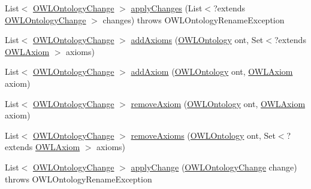 \begin{DoxyCompactItemize}
\item 
List$<$ \hyperlink{classorg_1_1semanticweb_1_1owlapi_1_1model_1_1_o_w_l_ontology_change}{O\-W\-L\-Ontology\-Change} $>$ \hyperlink{interfaceorg_1_1semanticweb_1_1owlapi_1_1model_1_1_o_w_l_ontology_manager_a57a1f7ecc3353740ff3c6b51084916b6}{apply\-Changes} (List$<$?extends \hyperlink{classorg_1_1semanticweb_1_1owlapi_1_1model_1_1_o_w_l_ontology_change}{O\-W\-L\-Ontology\-Change} $>$ changes)  throws O\-W\-L\-Ontology\-Rename\-Exception
\item 
List$<$ \hyperlink{classorg_1_1semanticweb_1_1owlapi_1_1model_1_1_o_w_l_ontology_change}{O\-W\-L\-Ontology\-Change} $>$ \hyperlink{interfaceorg_1_1semanticweb_1_1owlapi_1_1model_1_1_o_w_l_ontology_manager_a40d5dd3a748269c6281a6a97a570e89c}{add\-Axioms} (\hyperlink{interfaceorg_1_1semanticweb_1_1owlapi_1_1model_1_1_o_w_l_ontology}{O\-W\-L\-Ontology} ont, Set$<$?extends \hyperlink{interfaceorg_1_1semanticweb_1_1owlapi_1_1model_1_1_o_w_l_axiom}{O\-W\-L\-Axiom} $>$ axioms)
\item 
List$<$ \hyperlink{classorg_1_1semanticweb_1_1owlapi_1_1model_1_1_o_w_l_ontology_change}{O\-W\-L\-Ontology\-Change} $>$ \hyperlink{interfaceorg_1_1semanticweb_1_1owlapi_1_1model_1_1_o_w_l_ontology_manager_a531826deaaaee451ce7bd00003e65536}{add\-Axiom} (\hyperlink{interfaceorg_1_1semanticweb_1_1owlapi_1_1model_1_1_o_w_l_ontology}{O\-W\-L\-Ontology} ont, \hyperlink{interfaceorg_1_1semanticweb_1_1owlapi_1_1model_1_1_o_w_l_axiom}{O\-W\-L\-Axiom} axiom)
\item 
List$<$ \hyperlink{classorg_1_1semanticweb_1_1owlapi_1_1model_1_1_o_w_l_ontology_change}{O\-W\-L\-Ontology\-Change} $>$ \hyperlink{interfaceorg_1_1semanticweb_1_1owlapi_1_1model_1_1_o_w_l_ontology_manager_a15dee6602a229149bdd22a97509ec64a}{remove\-Axiom} (\hyperlink{interfaceorg_1_1semanticweb_1_1owlapi_1_1model_1_1_o_w_l_ontology}{O\-W\-L\-Ontology} ont, \hyperlink{interfaceorg_1_1semanticweb_1_1owlapi_1_1model_1_1_o_w_l_axiom}{O\-W\-L\-Axiom} axiom)
\item 
List$<$ \hyperlink{classorg_1_1semanticweb_1_1owlapi_1_1model_1_1_o_w_l_ontology_change}{O\-W\-L\-Ontology\-Change} $>$ \hyperlink{interfaceorg_1_1semanticweb_1_1owlapi_1_1model_1_1_o_w_l_ontology_manager_a4ed4760e61ae49ef8b472c57277d71ff}{remove\-Axioms} (\hyperlink{interfaceorg_1_1semanticweb_1_1owlapi_1_1model_1_1_o_w_l_ontology}{O\-W\-L\-Ontology} ont, Set$<$?extends \hyperlink{interfaceorg_1_1semanticweb_1_1owlapi_1_1model_1_1_o_w_l_axiom}{O\-W\-L\-Axiom} $>$ axioms)
\item 
List$<$ \hyperlink{classorg_1_1semanticweb_1_1owlapi_1_1model_1_1_o_w_l_ontology_change}{O\-W\-L\-Ontology\-Change} $>$ \hyperlink{interfaceorg_1_1semanticweb_1_1owlapi_1_1model_1_1_o_w_l_ontology_manager_a224f952940d3da726685ee49a6903189}{apply\-Change} (\hyperlink{classorg_1_1semanticweb_1_1owlapi_1_1model_1_1_o_w_l_ontology_change}{O\-W\-L\-Ontology\-Change} change)  throws O\-W\-L\-Ontology\-Rename\-Exception

\end{DoxyCompactItemize}
